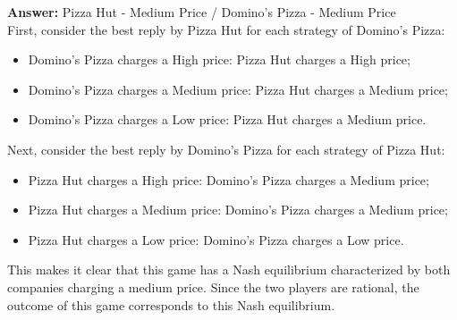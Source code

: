 \documentclass[11pt]{article}
\begin{document}
\textbf{Answer:} Pizza Hut - Medium Price / Domino's Pizza - Medium Price\\

First, consider the best reply by Pizza Hut for each strategy of Domino's
Pizza:
\begin{itemize}
\item Domino's Pizza charges a High price: Pizza Hut charges a High price;
\item Domino's Pizza charges a Medium price: Pizza Hut charges a Medium price;
\item Domino's Pizza charges a Low price: Pizza Hut charges a Medium price.
\end{itemize}
Next, consider the best reply by Domino's Pizza for each strategy of Pizza
Hut:
\begin{itemize}
\item Pizza Hut charges a High price: Domino's Pizza charges a Medium price;
\item Pizza Hut charges a Medium price: Domino's Pizza charges a Medium price;
\item Pizza Hut charges a Low price: Domino's Pizza charges a Low price.
\end{itemize}
This makes it clear that this game has a Nash equilibrium characterized by
both companies charging a medium price. Since the two players are rational,
the outcome of this game corresponds to this Nash equilibrium.
\end{document}
